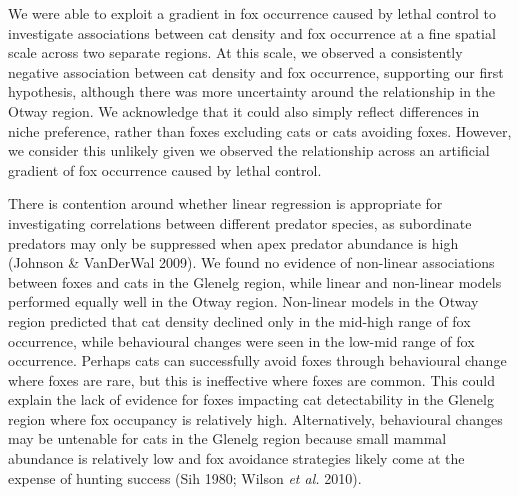 \documentclass[11pt,a4paper,titlepage,twoside,openright]{style/unimelbthesis}
\begin{document}
\begin{mainmatter}
We were able to exploit a gradient in fox occurrence caused by lethal control to investigate associations between cat density and fox occurrence at a fine spatial scale across two separate regions. At this scale, we observed a consistently negative association between cat density and fox occurrence, supporting our first hypothesis, although there was more uncertainty around the relationship in the Otway region. We acknowledge that it could also simply reflect differences in niche preference, rather than foxes excluding cats or cats avoiding foxes. However, we consider this unlikely given we observed the relationship across an artificial gradient of fox occurrence caused by lethal control.

There is contention around whether linear regression is appropriate for investigating correlations between different predator species, as subordinate predators may only be suppressed when apex predator abundance is high (Johnson \& VanDerWal 2009). We found no evidence of non-linear associations between foxes and cats in the Glenelg region, while linear and non-linear models performed equally well in the Otway region. Non-linear models in the Otway region predicted that cat density declined only in the mid-high range of fox occurrence, while behavioural changes were seen in the low-mid range of fox occurrence. Perhaps cats can successfully avoid foxes through behavioural change where foxes are rare, but this is ineffective where foxes are common. This could explain the lack of evidence for foxes impacting cat detectability in the Glenelg region where fox occupancy is relatively high. Alternatively, behavioural changes may be untenable for cats in the Glenelg region because small mammal abundance is relatively low and fox avoidance strategies likely come at the expense of hunting success (Sih 1980; Wilson \emph{et al.} 2010).


\end{mainmatter}
\end{document}
